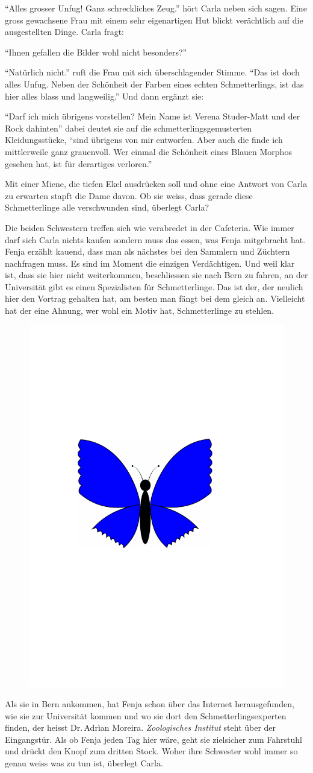 \enquote{Alles grosser Unfug! Ganz schreckliches Zeug.} hört Carla neben sich sagen. Eine gross gewachsene Frau mit einem sehr eigenartigen Hut blickt verächtlich auf die ausgestellten Dinge. Carla fragt:

\enquote{Ihnen gefallen die Bilder wohl nicht besonders?}

\enquote{Natürlich nicht.} ruft die Frau mit sich überschlagender Stimme. \enquote{Das ist doch alles Unfug. Neben der Schönheit der Farben eines echten Schmetterlings, ist das hier alles blass und langweilig.} Und dann ergänzt sie:

\enquote{Darf ich mich übrigens vorstellen? Mein Name ist Verena Studer-Matt und der Rock dahinten} dabei deutet sie auf die schmetterlingsgemusterten Kleidungsstücke, \enquote{sind übrigens von mir entworfen. Aber auch die finde ich mittlerweile ganz grauenvoll. Wer einmal die Schönheit eines Blauen Morphos gesehen hat, ist für derartiges verloren.} 


Mit einer Miene, die tiefen Ekel ausdrücken soll und ohne eine Antwort von Carla zu erwarten stapft die Dame davon. Ob sie weiss, dass gerade diese Schmetterlinge alle verschwunden sind, überlegt Carla?

Die beiden Schwestern treffen sich wie verabredet in der Cafeteria. Wie immer darf sich Carla nichts kaufen sondern muss das essen, was Fenja mitgebracht hat. Fenja erzählt kauend, dass man als nächstes bei den Sammlern und Züchtern nachfragen muss. Es sind im Moment die einzigen Verdächtigen. Und weil klar ist, dass sie hier nicht weiterkommen, beschliessen sie nach Bern zu fahren, an der Universität gibt es einen Spezialisten für Schmetterlinge. Das ist der, der neulich hier den Vortrag gehalten hat, am besten man fängt bei dem gleich an. Vielleicht hat der eine Ahnung, wer wohl ein Motiv hat, Schmetterlinge zu stehlen.
\begin{figure}[H]
\centering
\includegraphics[width=.05\textwidth]{bilder/inkling.pdf}
\end{figure}
Als sie in Bern ankommen, hat Fenja schon über das Internet herausgefunden, wie sie zur Universität kommen und wo sie dort den Schmetterlingsexperten finden, der heisst Dr.\,Adrìan Moreira. \emph{Zoologisches Institut} steht über der Eingangstür. Als ob Fenja jeden Tag hier wäre, geht sie zielsicher zum Fahrstuhl und drückt den Knopf zum dritten Stock. Woher ihre Schwester wohl immer so genau weiss was zu tun ist, überlegt Carla.

